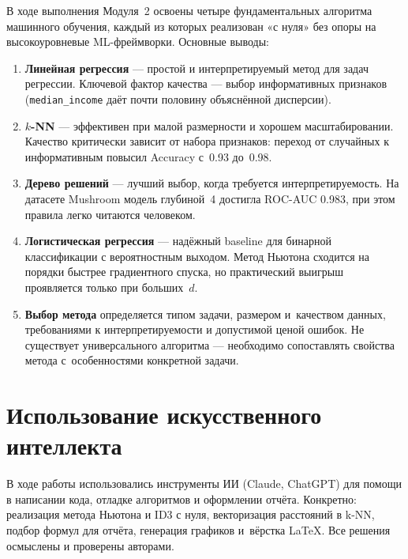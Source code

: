 \documentclass[12pt,a4paper]{article}
\begin{document}
В ходе выполнения Модуля~2 освоены четыре фундаментальных алгоритма
машинного обучения, каждый из которых реализован «с нуля» без опоры
на высокоуровневые ML-фреймворки. Основные выводы:

\begin{enumerate}
    \item \textbf{Линейная регрессия} — простой и интерпретируемый
          метод для задач регрессии. Ключевой фактор качества —
          выбор информативных признаков (\texttt{median\_income} даёт
          почти половину объяснённой дисперсии).
    \item \textbf{\(k\)-NN} — эффективен при малой размерности и
          хорошем масштабировании. Качество критически зависит от
          набора признаков: переход от случайных к информативным
          повысил Accuracy с~0.93 до~0.98.
    \item \textbf{Дерево решений} — лучший выбор, когда требуется
          интерпретируемость. На датасете Mushroom модель глубиной~4
          достигла ROC-AUC 0.983, при этом правила легко читаются
          человеком.
    \item \textbf{Логистическая регрессия} — надёжный baseline для
          бинарной классификации с вероятностным выходом. Метод
          Ньютона сходится на порядки быстрее градиентного спуска,
          но практический выигрыш проявляется только при больших~\(d\).
    \item \textbf{Выбор метода} определяется типом задачи, размером
          и~качеством данных, требованиями к интерпретируемости и
          допустимой ценой ошибок. Не существует универсального
          алгоритма — необходимо сопоставлять свойства метода
          с~особенностями конкретной задачи.
\end{enumerate}

\newpage

\section*{Использование искусственного интеллекта}

В ходе работы использовались инструменты ИИ (Claude, ChatGPT) для
помощи в написании кода, отладке алгоритмов и оформлении отчёта.
Конкретно: реализация метода Ньютона и ID3 с нуля, векторизация
расстояний в k-NN, подбор формул для отчёта, генерация графиков
и~вёрстка \LaTeX. Все решения осмыслены и проверены авторами.
\end{document}
